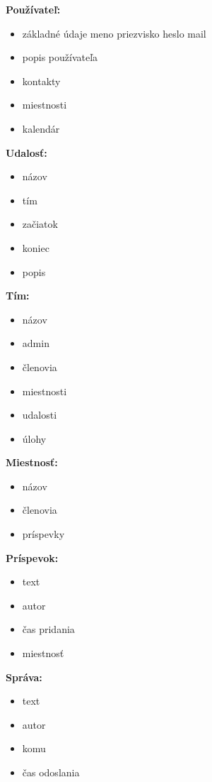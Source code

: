 \textbf{Používateľ:}
\indent\begin{itemize}
    \item základné údaje meno priezvisko heslo mail
    \item popis používateľa
    \item kontakty 
    \item miestnosti
    \item kalendár 
\end{itemize}

\textbf{Udalosť:}
\indent\begin{itemize}
    \item názov
    \item tím 
    \item začiatok
    \item koniec
    \item popis 
\end{itemize}

\textbf{Tím:}
\indent\begin{itemize}
    \item názov
    \item admin 
    \item členovia  
    \item miestnosti 
    \item udalosti 
    \item úlohy 
\end{itemize}

\textbf{Miestnosť:}
\indent\begin{itemize}
    \item názov
    \item členovia 
    \item príspevky 
\end{itemize}

\textbf{Príspevok:}
\indent\begin{itemize}
    \item text
    \item autor
    \item čas pridania
    \item miestnosť
\end{itemize}

\textbf{Správa:}
\indent\begin{itemize}
    \item text
    \item autor 
    \item komu
    \item čas odoslania
\end{itemize}

